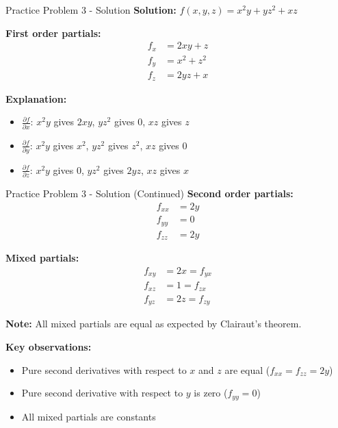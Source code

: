 \documentclass[aspectratio=169]{beamer}
\begin{document}
\begin{frame}{Practice Problem 3 - Solution}
\textbf{Solution:} $f(x,y,z) = x^2y + yz^2 + xz$

\textbf{First order partials:}
\begin{align*}
    f_x &= 2xy + z \\
    f_y &= x^2 + z^2 \\
    f_z &= 2yz + x
\end{align*}

\textbf{Explanation:}
\begin{itemize}
    \item $\frac{\partial f}{\partial x}$: $x^2y$ gives $2xy$, $yz^2$ gives $0$, $xz$ gives $z$
    \item $\frac{\partial f}{\partial y}$: $x^2y$ gives $x^2$, $yz^2$ gives $z^2$, $xz$ gives $0$
    \item $\frac{\partial f}{\partial z}$: $x^2y$ gives $0$, $yz^2$ gives $2yz$, $xz$ gives $x$
\end{itemize}
\end{frame}

\begin{frame}{Practice Problem 3 - Solution (Continued)}
\textbf{Second order partials:}
\begin{align*}
    f_{xx} &= 2y \\
    f_{yy} &= 0 \\
    f_{zz} &= 2y
\end{align*}

\textbf{Mixed partials:}
\begin{align*}
    f_{xy} &= 2x = f_{yx} \\
    f_{xz} &= 1 = f_{zx} \\
    f_{yz} &= 2z = f_{zy}
\end{align*}

\textbf{Note:} All mixed partials are equal as expected by Clairaut's theorem.

\textbf{Key observations:}
\begin{itemize}
    \item Pure second derivatives with respect to $x$ and $z$ are equal ($f_{xx} = f_{zz} = 2y$)
    \item Pure second derivative with respect to $y$ is zero ($f_{yy} = 0$)
    \item All mixed partials are constants
\end{itemize}
\end{frame}
\end{document}
